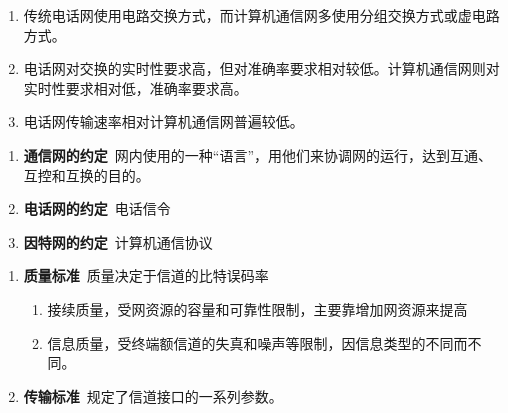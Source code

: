\begin{enumerate}
 	\item 传统电话网使用电路交换方式，而计算机通信网多使用分组交换方式或虚电路方式。
 	\item 电话网对交换的实时性要求高，但对准确率要求相对较低。计算机通信网则对实时性要求相对低，准确率要求高。
 	\item 电话网传输速率相对计算机通信网普遍较低。
\end{enumerate}
	\begin{enumerate}
		\item \textbf{通信网的约定}\ 网内使用的一种``语言''，用他们来协调网的运行，达到互通、互控和互换的目的。
		\item \textbf{电话网的约定}\ 电话信令
		\item \textbf{因特网的约定}\ 计算机通信协议
	\end{enumerate}
 	\begin{enumerate}
 		\item \textbf{质量标准}\ 质量决定于信道的比特误码率
		\begin{enumerate}
			\item 接续质量，受网资源的容量和可靠性限制，主要靠增加网资源来提高
			\item 信息质量，受终端额信道的失真和噪声等限制，因信息类型的不同而不同。
		\end{enumerate}
		\item \textbf{传输标准}\ 规定了信道接口的一系列参数。
 	\end{enumerate}

